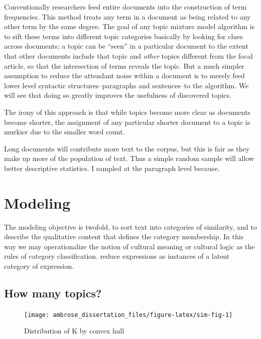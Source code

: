 \documentclass[]{book}
\begin{document}
Conventionally researchers feed entire documents into the construction
of term frequencies. This method treats any term in a document as being
related to any other term by the same degree. The goal of any topic
mixture model algorithm is to sift these terms into different topic
categories basically by looking for clues across documents; a topic can
be ``seen'' in a particular document to the extent that other documents
include that topic and \emph{other} topics different from the focal
article, so that the intersection of terms reveals the topic. But a much
simpler assumption to reduce the attendant noise within a document is to
merely feed lower level syntactic structures--paragraphs and
sentences--to the algorithm. We will see that doing so greatly improves
the usefulness of discovered topics.

The irony of this approach is that while topics become more clear as
documents become shorter, the assignment of any particular shorter
document to a topic is murkier due to the smaller word count.

Long documents will contribute more text to the corpus, but this is fair
as they make up more of the population of text. Thus a simple random
sample will allow better descriptive statistics. I sampled at the
paragraph level because.

\chapter{Modeling}\label{kd-dp2}

The modeling objective is twofold, to sort text into categories of
similarity, and to describe the qualitative content that defines the
category membership. In this way we may operationalize the notion of
cultural meaning or cultural logic as the rules of category
classification. reduce expressions as instances of a latent category of
expression.

\section{How many topics?}\label{how-many-topics}

\begin{figure}

{\centering \texttt{[image: ambrose\_dissertation\_files/figure-latex/sim-fig-1]} 

}

\caption{Distribution of K by convex hull}\label{fig:sim-fig}
\end{figure}
\end{document}

